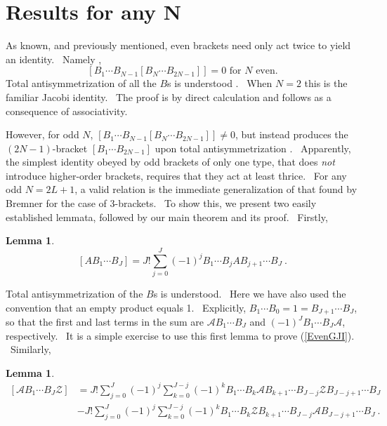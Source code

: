\documentclass[aps,preprint,tightenlines,unsortedaddress,11pt]{revtex4}\usepackage{amsfonts}
\newtheorem{lemma}[theorem]{Lemma}
\begin{document}
\section{Results for any N}

As known, and previously mentioned, even brackets need only act twice to yield
an identity. \ Namely \cite{deAzcarraga,Hanlon},
\begin{equation}
\left[  B_{1}\cdots B_{N-1}\left[  B_{N}\cdots B_{2N-1}\right]  \right]
=0\text{ \ \ for }N\text{ even.} \label{EvenGJI}\end{equation}
Total antisymmetrization of all the $B$s is understood \cite{Footnote1}.
\ When $N=2$ this is the familiar Jacobi identity. \ The proof is by direct
calculation and follows as a consequence of associativity.

However, for odd $N$, $\left[  B_{1}\cdots B_{N-1}\left[  B_{N}\cdots
B_{2N-1}\right]  \right]  \neq0$, but instead produces the $\left(
2N-1\right)  $-bracket $\left[  B_{1}\cdots B_{2N-1}\right]  $ upon total
antisymmetrization \cite{deAzcarraga,Curtright}. \ Apparently, the simplest
identity obeyed by odd brackets of only one type, that does \emph{not}
introduce higher-order brackets, requires that they act at least thrice. \ For
any odd $N=2L+1$, a valid relation is the immediate generalization of that
found by Bremner for the case of $3$-brackets. \ To show this, we present two
easily established lemmata, followed by our main theorem and its proof. \ Firstly,

\begin{lemma}\begin{equation}
\left[  AB_{1}\cdots B_{J}\right]  =J!\sum_{j=0}^{J}\left(  -1\right)
^{j}B_{1}\cdots B_{j}AB_{j+1}\cdots B_{J}\ . \label{Lemma1}\end{equation}

\end{lemma}

\noindent Total antisymmetrization of the $B$s is understood. \ Here we have
also used the convention that an empty product equals 1. \ Explicitly,
$B_{1}\cdots B_{0}=1=B_{J+1}\cdots B_{J}$, so that the first and last terms in
the sum are $\mathcal{A}B_{1}\cdots B_{J}$ and $\left(  -1\right)  ^{J}B_{1}\cdots B_{J}\mathcal{A}$, respectively. \ It is a simple exercise to use
this first lemma to prove (\ref{EvenGJI}). \ Similarly,

\begin{lemma}\begin{align}
\left[  \mathcal{A}B_{1}\cdots B_{J}\mathcal{Z}\right]   &  =J!\sum_{j=0}^{J}\left(  -1\right)  ^{j}\sum_{k=0}^{J-j}\left(  -1\right)  ^{k}B_{1}\cdots
B_{k}\mathcal{A}B_{k+1}\cdots B_{J-j}\mathcal{Z}B_{J-j+1}\cdots B_{J}\nonumber\\
&  -J!\sum_{j=0}^{J}\left(  -1\right)  ^{j}\sum_{k=0}^{J-j}\left(  -1\right)
^{k}B_{1}\cdots B_{k}\mathcal{Z}B_{k+1}\cdots B_{J-j}\mathcal{A}B_{J-j+1}\cdots B_{J}\ . \label{Lemma2}\end{align}

\end{lemma}
\end{document}
